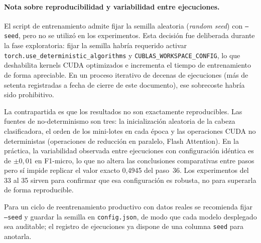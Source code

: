 \paragraph{Nota sobre reproducibilidad y variabilidad entre ejecuciones.}
\begin{sloppypar}
El script de entrenamiento admite fijar la semilla aleatoria (\emph{random seed}) con \texttt{--seed}, pero no se utilizó en los experimentos. Esta decisión fue deliberada durante la fase exploratoria: fijar la semilla habría requerido activar \texttt{torch.use\_deterministic\_algorithms} y \texttt{CUBLAS\_WORKSPACE\_CONFIG}, lo que deshabilita kernels CUDA optimizados e incrementa el tiempo de entrenamiento de forma apreciable. En un proceso iterativo de decenas de ejecuciones (más de setenta registradas a fecha de cierre de este documento), ese sobrecoste habría sido prohibitivo.
\end{sloppypar}

La contrapartida es que los resultados no son exactamente reproducibles. Las fuentes de no-determinismo son tres: la inicialización aleatoria de la cabeza clasificadora, el orden de los mini-lotes en cada época y las operaciones CUDA no deterministas (operaciones de reducción en paralelo, Flash Attention). En la práctica, la variabilidad observada entre ejecuciones con configuración idéntica es de $\pm 0{,}01$ en F1-micro, lo que no altera las conclusiones comparativas entre pasos pero sí impide replicar el valor exacto 0,4945 del paso~36. Los experimentos del 33 al 35 sirven para confirmar que esa configuración es robusta, no para superarla de forma reproducible.

Para un ciclo de reentrenamiento productivo con datos reales se recomienda fijar \texttt{--seed} y guardar la semilla en \texttt{config.json}, de modo que cada modelo desplegado sea auditable; el registro de ejecuciones ya dispone de una columna \texttt{seed} para anotarla.

